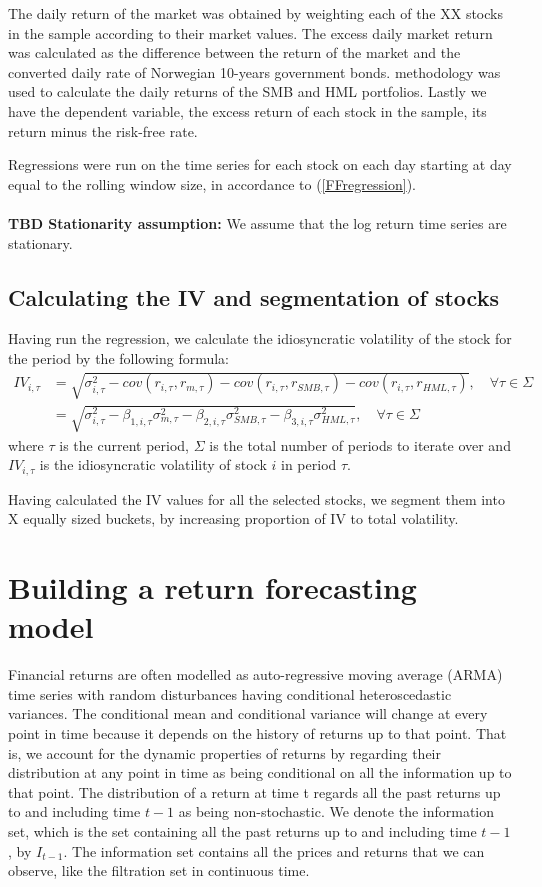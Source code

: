 The daily return of the market was obtained by weighting each of the XX stocks in the sample according to their market values. The excess daily market return was calculated as the difference between the return of the market and the converted daily rate of Norwegian 10-years government bonds. \cite{famafrench} methodology was used to calculate the daily returns of the SMB and HML portfolios. Lastly we have the dependent variable, the excess return of each stock in the sample, its return minus the risk-free rate.

Regressions were run on the time series for each stock on each day starting at day equal to the rolling window size, in accordance to  (\ref{FFregression}). 
\\\\
\textbf{TBD Stationarity assumption: } We assume that the log return time series are stationary.

\subsection*{Calculating the IV and segmentation of stocks}
Having run the regression, we calculate the idiosyncratic volatility of the stock for the period by the following formula:
 \begin{align}
    IV_{i,\tau} &= \sqrt{\sigma_{i,\tau}^{2} - cov(r_{i,\tau},r_{m,\tau}) - cov(r_{i,\tau},r_{SMB,\tau}) - cov(r_{i,\tau},r_{HML,\tau})}, \quad \forall \tau \in \Sigma \\
    &= \sqrt{\sigma_{i,\tau}^2 - \beta_{1,i,\tau} \sigma_{m,\tau}^{2}- \beta_{2,i,\tau} \sigma_{SMB,\tau}^{2}- \beta_{3,i,\tau} \sigma_{HML,\tau}^{2}}, \quad \forall \tau \in \Sigma
\end{align}
where $\tau$ is the current period, $\Sigma$ is the total number of periods to iterate over and $IV_{i,\tau}$ is the idiosyncratic volatility of stock $i$ in period $\tau$.

Having calculated the IV values for all the selected stocks, we segment them into X equally sized buckets, by increasing proportion of IV to total volatility.

\section*{Building a return forecasting model} 


Financial returns are often modelled as auto-regressive moving average (ARMA) time series with random disturbances having conditional heteroscedastic variances. The conditional mean and conditional variance will change at every point in time because it depends on the history of returns up to that point. That is, we account for the dynamic properties of returns by regarding their distribution at any point in time as being conditional on all the information up to that point. The distribution of a return at time t regards all the past returns up to and including time $t-1$ as being non-stochastic. We denote the information set, which is the set containing all the past returns up to and including time $t-1$, by $I_{t-1}$. The information set contains all the prices and returns that we can observe, like the filtration set in continuous time. 

